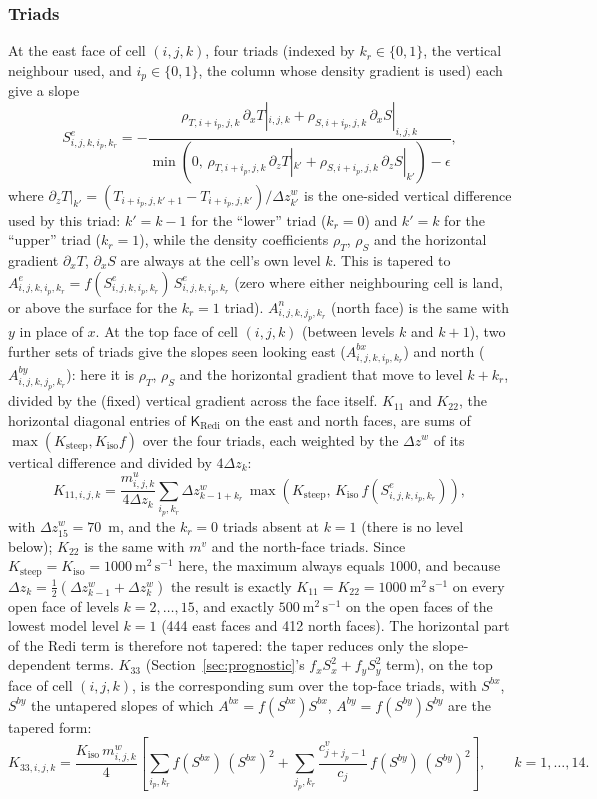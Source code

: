 \documentclass{article}
\begin{document}
\subsubsection*{Triads}
At the east face of cell $(i,j,k)$, four triads (indexed by $k_r \in \{0,1\}$, the vertical neighbour used, and $i_p \in \{0,1\}$, the column whose density gradient is used) each give a slope
\[
S^e_{i,j,k,i_p,k_r} = -\frac{\rho_{T,i+i_p,j,k}\,\partial_x T|_{i,j,k} + \rho_{S,i+i_p,j,k}\,\partial_x S|_{i,j,k}}{\min(0,\, \rho_{T,i+i_p,j,k}\,\partial_z T|_{k'} + \rho_{S,i+i_p,j,k}\,\partial_z S|_{k'}) - \epsilon},
\]
where $\partial_z T|_{k'} = (T_{i+i_p,j,k'+1}-T_{i+i_p,j,k'})/\Delta z^w_{k'}$ is the one-sided vertical difference used by this triad: $k' = k-1$ for the ``lower'' triad ($k_r=0$) and $k'=k$ for the ``upper'' triad ($k_r=1$), while the density coefficients $\rho_T$, $\rho_S$ and the horizontal gradient $\partial_x T$, $\partial_x S$ are always at the cell's own level $k$.
This is tapered to $A^e_{i,j,k,i_p,k_r} = f(S^e_{i,j,k,i_p,k_r})\,S^e_{i,j,k,i_p,k_r}$ (zero where either neighbouring cell is land, or above the surface for the $k_r=1$ triad).
$A^n_{i,j,k,j_p,k_r}$ (north face) is the same with $y$ in place of $x$.
At the top face of cell $(i,j,k)$ (between levels $k$ and $k+1$), two further sets of triads give the slopes seen looking east ($A^{bx}_{i,j,k,i_p,k_r}$) and north ($A^{by}_{i,j,k,j_p,k_r}$): here it is $\rho_T$, $\rho_S$ and the horizontal gradient that move to level $k+k_r$, divided by the (fixed) vertical gradient across the face itself.
$K_{11}$ and $K_{22}$, the horizontal diagonal entries of $\mathsf{K}_\text{Redi}$ on the east and north faces, are sums of $\max(K_\text{steep}, K_\text{iso}f)$ over the four triads, each weighted by the $\Delta z^w$ of its vertical difference and divided by $4\Delta z_k$:
\[
K_{11,i,j,k} = \frac{m^u_{i,j,k}}{4\Delta z_k}\sum_{i_p,k_r} \Delta z^w_{k-1+k_r}\, \max\!\left(K_\text{steep},\, K_\text{iso}\, f(S^e_{i,j,k,i_p,k_r})\right),
\]
with $\Delta z^w_{15} = 70$~m, and the $k_r = 0$ triads absent at $k=1$ (there is no level below); $K_{22}$ is the same with $m^v$ and the north-face triads.
Since $K_\text{steep}=K_\text{iso}=1000~\text{m}^2\,\text{s}^{-1}$ here, the maximum always equals $1000$, and because $\Delta z_k = \tfrac12(\Delta z^w_{k-1}+\Delta z^w_k)$ the result is exactly $K_{11}=K_{22}=1000~\text{m}^2\,\text{s}^{-1}$ on every open face of levels $k = 2,\dots,15$, and exactly $500~\text{m}^2\,\text{s}^{-1}$ on the open faces of the lowest model level $k=1$ (444 east faces and 412 north faces).
The horizontal part of the Redi term is therefore not tapered: the taper reduces only the slope-dependent terms.
$K_{33}$ (Section~\ref{sec:prognostic}'s $f_xS_x^2+f_yS_y^2$ term), on the top face of cell $(i,j,k)$, is the corresponding sum over the top-face triads, with $S^{bx}$, $S^{by}$ the untapered slopes of which $A^{bx} = f(S^{bx})S^{bx}$, $A^{by} = f(S^{by})S^{by}$ are the tapered form:
\[
K_{33,i,j,k} = \frac{K_\text{iso}\, m^w_{i,j,k}}{4}\left[ \sum_{i_p,k_r} f(S^{bx})\,(S^{bx})^2 + \sum_{j_p,k_r} \frac{c^v_{j+j_p-1}}{c_j}\, f(S^{by})\,(S^{by})^2 \right], \qquad k = 1,\dots,14 .
\]
\end{document}
